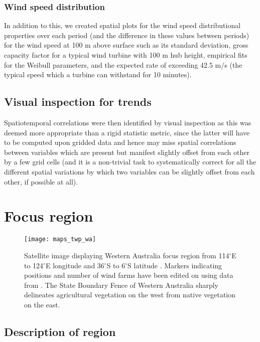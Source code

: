 \subsubsection{Wind speed distribution}

In addition to this, we created spatial plots for the wind speed distributional properties over each period (and the difference in these values between periods) for the wind speed at 100 m above surface such as its standard deviation, gross capacity factor for a typical wind turbine with 100 m hub height, empirical fits for the Weibull parameters, and the expected rate of exceeding 42.5 m/s (the typical speed which a turbine can withstand for 10 minutes).

\subsection{Visual inspection for trends}

Spatiotemporal correlations were then identified by visual inspection as this was deemed more appropriate than a rigid statistic metric, since the latter will have to be computed upon gridded data and hence may miss spatial correlations between variables which are present but manifest slightly offset from each other by a few grid cells (and it is a non-trivial task to systematically correct for all the different spatial variations by which two variables can be slightly offset from each other, if possible at all).

\section{Focus region}

\begin{figure}[!ht]
	\centering
	\texttt{[image: maps\_twp\_wa]}
	\caption[Western Australia Map]{Satellite image displaying Western Australia focus region from 114$^\circ$E to 124$^\circ$E longitude and 36$^\circ$S to 6$^\circ$S latitude \citep{maps_wa}. Markers indicating positions and number of wind farms have been edited on using data from \citep{twp_wa}. The State Boundary Fence of Western Australia sharply delineates agricultural vegetation on the west from native vegetation on the east.}
	\label{fig:maps_twp_wa}
\end{figure}

\subsection{Description of region}

